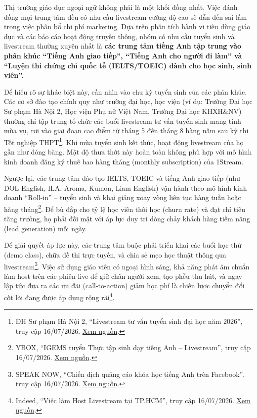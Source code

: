Thị trường giáo dục ngoại ngữ không phải là một khối đồng nhất. Việc đánh đồng mọi trung tâm đều có nhu cầu livestream cường độ cao sẽ dẫn đến sai lầm trong việc phân bổ chi phí marketing. Dựa trên phân tích hành vi tiêu dùng giáo dục và các báo cáo hoạt động truyền thông, nhóm có nhu cầu tuyển sinh và livestream thường xuyên nhất là \textbf{các trung tâm tiếng Anh tập trung vào phân khúc ``Tiếng Anh giao tiếp'', ``Tiếng Anh cho người đi làm'' và ``Luyện thi chứng chỉ quốc tế (IELTS/TOEIC) dành cho học sinh, sinh viên''.}

Để hiểu rõ sự khác biệt này, cần nhìn vào chu kỳ tuyển sinh của các phân khúc. Các cơ sở đào tạo chính quy như trường đại học, học viện (ví dụ: Trường Đại học Sư phạm Hà Nội 2, Học viện Phụ nữ Việt Nam, Trường Đại học KHXH\&NV) thường chỉ tập trung tổ chức các buổi livestream tư vấn tuyển sinh mang tính mùa vụ, rơi vào giai đoạn cao điểm từ tháng 5 đến tháng 8 hàng năm sau kỳ thi Tốt nghiệp THPT\footnote{ĐH Sư phạm Hà Nội 2, ``Livestream tư vấn tuyển sinh đại học năm 2026'', truy cập 16/07/2026. \href{https://english.hpu2.edu.vn/livestream-tu-van-tuyen-sinh-dai-hoc-nam-2026.html}{Xem nguồn}.}. Khi mùa tuyển sinh kết thúc, hoạt động livestream của họ gần như đóng băng. Mật độ thưa thớt này hoàn toàn không phù hợp với mô hình kinh doanh đăng ký thuê bao hàng tháng (monthly subscription) của 1Stream.

Ngược lại, các trung tâm đào tạo IELTS, TOEIC và tiếng Anh giao tiếp (như DOL English, ILA, Aroma, Kumon, Liam English) vận hành theo mô hình kinh doanh ``Roll-in'' -- tuyển sinh và khai giảng xoay vòng liên tục hàng tuần hoặc hàng tháng\footnote{YBOX, ``IGEMS tuyển Thực tập sinh dạy tiếng Anh -- Livestream'', truy cập 16/07/2026. \href{https://ybox.vn/tuyen-dung/online-trung-tam-tieng-anh-igems-tuyen-dung-thuc-tap-sinh-day-tieng-anh-full-time-2025-67dd13aff49350455812bb8e}{Xem nguồn}.}. Để bù đắp cho tỷ lệ học viên thôi học (churn rate) và đạt chỉ tiêu tăng trưởng, họ phải đối mặt với áp lực duy trì dòng chảy khách hàng tiềm năng (lead generation) mỗi ngày.

Để giải quyết áp lực này, các trung tâm buộc phải triển khai các buổi học thử (demo class), chữa đề thi trực tuyến, và chia sẻ mẹo học thuật thông qua livestream\footnote{SPEAK NOW, ``Chiến dịch quảng cáo khóa học tiếng Anh trên Facebook'', truy cập 16/07/2026. \href{https://speaknow.vn/phu-kim-quy-chia-se-chien-dich-quang-cao-khoa-hoc-tieng-anh-tren-facebook/}{Xem nguồn}.}. Việc sử dụng giáo viên có ngoại hình sáng, khả năng phát âm chuẩn làm host trên các phiên live để giữ chân người xem, tạo phễu thu hút, và ngay lập tức đưa ra các ưu đãi (call-to-action) giảm học phí là chiến lược chuyển đổi cốt lõi đang được áp dụng rộng rãi\footnote{Indeed, ``Việc làm Host Livestream tại TP.HCM'', truy cập 16/07/2026. \href{https://vn.indeed.com/q-host-livestream-l-thanh-pho-ho-chi-minh-viec-lam.html}{Xem nguồn}.}.

